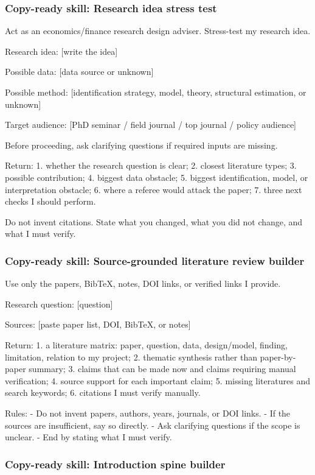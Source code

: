 \documentclass[11pt]{article}
\newcommand{\skill}[1]{\subsubsection*{Copy-ready skill: #1}}
\begin{document}
\skill{Research idea stress test}

\begin{promptblock}
Act as an economics/finance research design adviser. Stress-test my research idea.

Research idea:
[write the idea]

Possible data:
[data source or unknown]

Possible method:
[identification strategy, model, theory, structural estimation, or unknown]

Target audience:
[PhD seminar / field journal / top journal / policy audience]

Before proceeding, ask clarifying questions if required inputs are missing.

Return:
1. whether the research question is clear;
2. closest literature types;
3. possible contribution;
4. biggest data obstacle;
5. biggest identification, model, or interpretation obstacle;
6. where a referee would attack the paper;
7. three next checks I should perform.

Do not invent citations. State what you changed, what you did not change,
and what I must verify.
\end{promptblock}

\skill{Source-grounded literature review builder}

\begin{promptblock}
Use only the papers, BibTeX, notes, DOI links, or verified links I provide.

Research question:
[question]

Sources:
[paste paper list, DOI, BibTeX, or notes]

Return:
1. a literature matrix: paper, question, data, design/model, finding, limitation,
   relation to my project;
2. thematic synthesis rather than paper-by-paper summary;
3. claims that can be made now and claims requiring manual verification;
4. source support for each important claim;
5. missing literatures and search keywords;
6. citations I must verify manually.

Rules:
- Do not invent papers, authors, years, journals, or DOI links.
- If the sources are insufficient, say so directly.
- Ask clarifying questions if the scope is unclear.
- End by stating what I must verify.
\end{promptblock}

\skill{Introduction spine builder}
\end{document}
